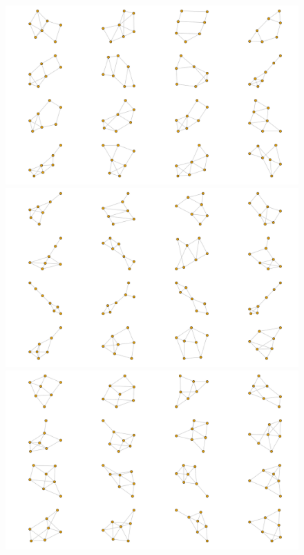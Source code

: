 \begin{figure}[h!]
	\subfloat
	{\includegraphics[width=0.95\linewidth]{atlas/atlas7-8.png}} \\
	\subfloat
    {\includegraphics[width=0.95\linewidth]{atlas/atlas7-9.png}} \\
    \subfloat
    {\includegraphics[width=0.95\linewidth]{atlas/atlas7-10.png}}
\end{figure}

